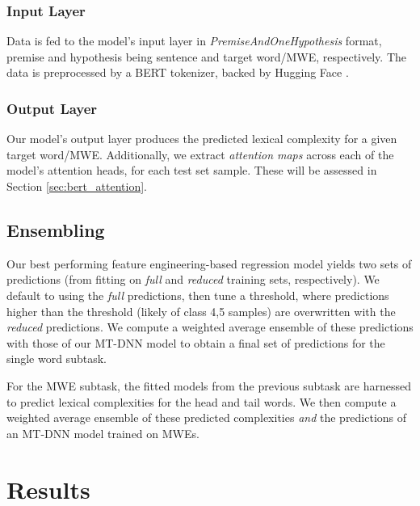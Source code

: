 \documentclass[11pt,a4paper]{article}
\begin{document}
\subsubsection{Input Layer}

Data is fed to the model's input layer in \textit{PremiseAndOneHypothesis} format, premise and hypothesis being sentence and target word/MWE, respectively. The data is preprocessed by a BERT tokenizer, backed by Hugging Face \citep{wolf2020transformers}.

\subsubsection{Output Layer}

Our model's output layer produces the predicted lexical complexity for a given target word/MWE. Additionally, we extract \textit{attention maps} across each of the model's attention heads, for each test set sample. These will be assessed in Section \ref{sec:bert_attention}.

\subsection{Ensembling}

\label{sec:ensembling}

Our best performing feature engineering-based regression model yields two sets of predictions (from fitting on \textit{full} and \textit{reduced} training sets, respectively). We default to using the \textit{full} predictions, then tune a threshold, where predictions higher than the threshold (likely of class 4,5 samples) are overwritten with the \textit{reduced} predictions. We compute a weighted average ensemble of these predictions with those of our MT-DNN model to obtain a final set of predictions for the single word subtask. 

For the MWE subtask, the fitted models from the previous subtask are harnessed to predict lexical complexities for the head and tail words. We then compute a weighted average ensemble of these predicted complexities \textit{and} the predictions of an MT-DNN model trained on MWEs.

\section{Results}
\end{document}
